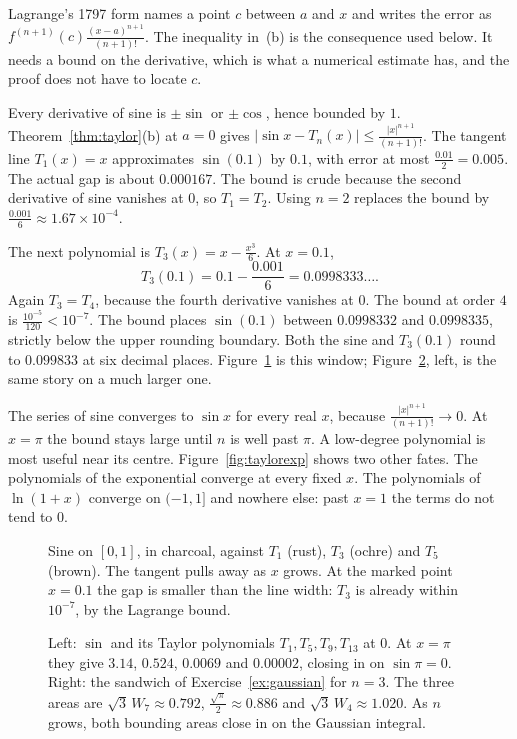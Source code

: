 Lagrange's 1797 form names a point $c$ between $a$ and $x$ and writes the error as $f^{(n+1)}(c)\frac{(x-a)^{n+1}}{(n+1)!}$. The inequality in~(b) is the consequence used below. It needs a bound on the derivative, which is what a numerical estimate has, and the proof does not have to locate $c$.

\begin{examplex}
Every derivative of sine is $\pm\sin$ or $\pm\cos$, hence bounded by $1$. Theorem~\ref{thm:taylor}(b) at $a=0$ gives $|\sin x-T_n(x)|\le\frac{|x|^{n+1}}{(n+1)!}$. The tangent line $T_1(x)=x$ approximates $\sin(0.1)$ by $0.1$, with error at most $\frac{0.01}2=0.005$. The actual gap is about $0.000167$. The bound is crude because the second derivative of sine vanishes at $0$, so $T_1=T_2$. Using $n=2$ replaces the bound by $\frac{0.001}6\approx1.67\times10^{-4}$.

The next polynomial is $T_3(x)=x-\frac{x^3}6$. At $x=0.1$,
\[
T_3(0.1)=0.1-\frac{0.001}6=0.0998333\ldots.
\]
Again $T_3=T_4$, because the fourth derivative vanishes at $0$. The bound at order $4$ is $\frac{10^{-5}}{120}<10^{-7}$. The bound places $\sin(0.1)$ between $0.0998332$ and $0.0998335$, strictly below the upper rounding boundary. Both the sine and $T_3(0.1)$ round to $0.099833$ at six decimal places. Figure~\ref{fig:zoom} is this window; Figure~\ref{fig:taylor}, left, is the same story on a much larger one.
\end{examplex}

The series of sine converges to $\sin x$ for every real $x$, because $\frac{|x|^{n+1}}{(n+1)!}\to0$. At $x=\pi$ the bound stays large until $n$ is well past $\pi$. A low-degree polynomial is most useful near its centre. Figure~\ref{fig:taylorexp} shows two other fates. The polynomials of the exponential converge at every fixed $x$. The polynomials of $\ln(1+x)$ converge on $(-1,1]$ and nowhere else: past $x=1$ the terms do not tend to $0$.

\begin{figure}[ht]
\centering
{}
\caption{Sine on $[0,1]$, in charcoal, against $T_1$ (rust), $T_3$ (ochre) and $T_5$ (brown). The tangent pulls away as $x$ grows. At the marked point $x=0.1$ the gap is smaller than the line width: $T_3$ is already within $10^{-7}$, by the Lagrange bound.}
\label{fig:zoom}
\end{figure}

\begin{figure}[ht]
\centering
{}
\caption{Left: $\sin$ and its Taylor polynomials $T_1,T_5,T_9,T_{13}$ at $0$. At $x=\pi$ they give $3.14$, $0.524$, $0.0069$ and $0.00002$, closing in on $\sin\pi=0$. Right: the sandwich of Exercise~\ref{ex:gaussian} for $n=3$. The three areas are $\sqrt3\,W_7\approx0.792$, $\frac{\sqrt\pi}2\approx0.886$ and $\sqrt3\,W_4\approx1.020$. As $n$ grows, both bounding areas close in on the Gaussian integral.}
\label{fig:taylor}
\end{figure}

